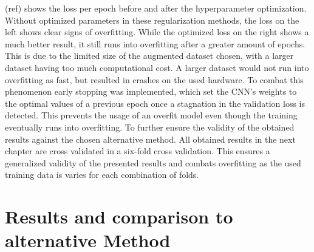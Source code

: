\noindent
(ref) shows the loss per epoch before and after the hyperparameter optimization. Without optimized parameters in these regularization methods, the loss on the left shows clear signs of overfitting. While the optimized loss on the right shows a much better result, it still runs into overfitting after a greater amount of epochs. This is due to the limited size of the augmented dataset chosen, with a larger dataset having too much computational cost. A larger dataset would not run into overfitting as fast, but resulted in crashes on the used hardware. To combat this phenomenon early stopping was implemented, which set the CNN's weights to the optimal values of a previous epoch once a stagnation in the validation loss is detected. This prevents the usage of an overfit model even though the training eventually runs into overfitting.
To further ensure the validity of the obtained results against the chosen alternative method. All obtained results in the next chapter are cross validated in a six-fold cross validation. This ensures a generalized validity of the presented results and combats overfitting as the used training data is varies for each combination of folds.
\section{Results and comparison to alternative Method}
    \label{sec:3}